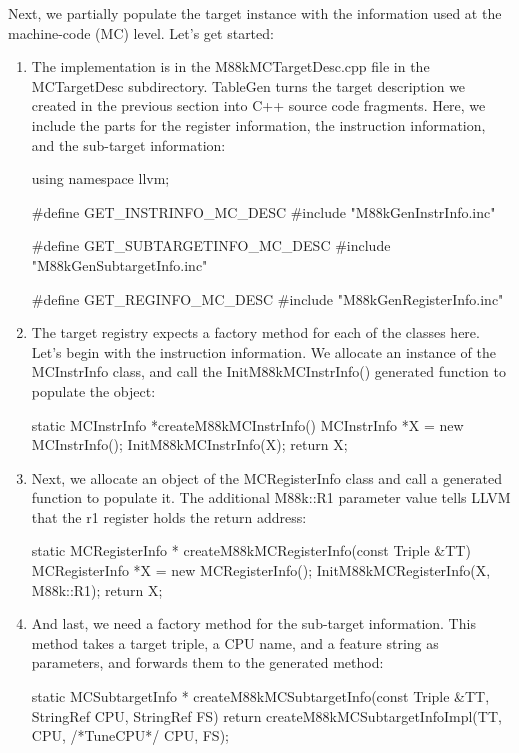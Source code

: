 Next, we partially populate the target instance with the information used at the machine-code (MC) level. Let’s get started:

\begin{enumerate}
\item
The implementation is in the M88kMCTargetDesc.cpp file in the MCTargetDesc subdirectory. TableGen turns the target description we created in the previous section into C++ source code fragments. Here, we include the parts for the register information, the instruction information, and the sub-target information:

\begin{cpp}
using namespace llvm;

#define GET_INSTRINFO_MC_DESC
#include "M88kGenInstrInfo.inc"

#define GET_SUBTARGETINFO_MC_DESC
#include "M88kGenSubtargetInfo.inc"

#define GET_REGINFO_MC_DESC
#include "M88kGenRegisterInfo.inc"
\end{cpp}

\item
The target registry expects a factory method for each of the classes here. Let’s begin with the instruction information. We allocate an instance of the MCInstrInfo class, and call the InitM88kMCInstrInfo() generated function to populate the object:

\begin{cpp}
static MCInstrInfo *createM88kMCInstrInfo() {
    MCInstrInfo *X = new MCInstrInfo();
    InitM88kMCInstrInfo(X);
    return X;
}
\end{cpp}

\item
Next, we allocate an object of the MCRegisterInfo class and call a generated function to populate it. The additional M88k::R1 parameter value tells LLVM that the r1 register holds the return address:

\begin{cpp}
static MCRegisterInfo *
createM88kMCRegisterInfo(const Triple &TT) {
    MCRegisterInfo *X = new MCRegisterInfo();
    InitM88kMCRegisterInfo(X, M88k::R1);
    return X;
}
\end{cpp}

\item
And last, we need a factory method for the sub-target information. This method takes a target triple, a CPU name, and a feature string as parameters, and forwards them to the generated method:

\begin{cpp}
static MCSubtargetInfo *
createM88kMCSubtargetInfo(const Triple &TT,
StringRef CPU, StringRef FS) {
    return createM88kMCSubtargetInfoImpl(TT, CPU,
                                        /*TuneCPU*/ CPU,
                                        FS);
}
\end{cpp}


\end{enumerate}

